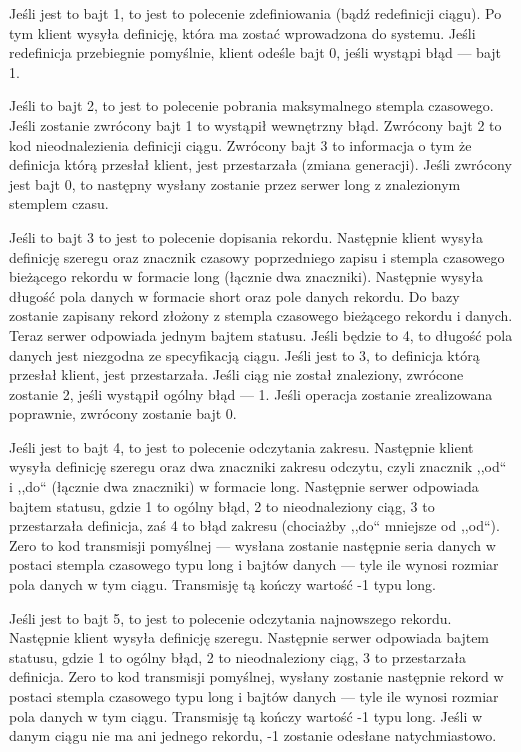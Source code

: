 \documentclass[a4paper,polish,12pt,twoside]{article}
\begin{document}
Jeśli jest to bajt 1, to jest to polecenie zdefiniowania (bądź redefinicji ciągu). Po tym klient wysyła definicję, która ma zostać wprowadzona do systemu. Jeśli redefinicja przebiegnie pomyślnie, klient odeśle bajt 0, jeśli wystąpi błąd --- bajt 1.

Jeśli to bajt 2, to jest to polecenie pobrania maksymalnego stempla czasowego. Jeśli zostanie zwrócony bajt 1 to wystąpił wewnętrzny błąd. Zwrócony bajt 2 to kod nieodnalezienia definicji ciągu. Zwrócony bajt 3 to informacja o tym że definicja którą przesłał klient, jest przestarzała (zmiana generacji). Jeśli zwrócony jest bajt 0, to następny wysłany zostanie przez serwer long z znalezionym stemplem czasu.

Jeśli to bajt 3 to jest to polecenie dopisania rekordu. Następnie klient wysyła definicję szeregu oraz znacznik czasowy poprzedniego zapisu i stempla czasowego bieżącego rekordu w formacie long (łącznie dwa znaczniki). Następnie wysyła długość pola danych w formacie short oraz pole danych rekordu. Do bazy zostanie zapisany rekord złożony z stempla czasowego bieżącego rekordu i danych.
Teraz serwer odpowiada jednym bajtem statusu. Jeśli będzie to 4, to długość pola danych jest niezgodna ze specyfikacją ciągu. Jeśli jest to 3, to definicja którą przesłał klient, jest przestarzała. Jeśli ciąg nie został znaleziony, zwrócone zostanie 2, jeśli wystąpił ogólny błąd --- 1. Jeśli operacja zostanie zrealizowana poprawnie, zwrócony zostanie bajt 0.

Jeśli jest to bajt 4, to jest to polecenie odczytania zakresu. Następnie klient wysyła definicję szeregu oraz dwa znaczniki zakresu odczytu, czyli znacznik ,,od`` i ,,do`` (łącznie dwa znaczniki) w formacie long. Następnie serwer odpowiada bajtem statusu, gdzie 1 to ogólny błąd, 2 to nieodnaleziony ciąg, 3 to przestarzała definicja, zaś 4 to błąd zakresu (chociażby ,,do`` mniejsze od ,,od``). Zero to kod transmisji pomyślnej --- wysłana zostanie następnie seria danych w postaci stempla czasowego typu long i bajtów danych --- tyle ile wynosi rozmiar pola danych w tym ciągu. Transmisję tą kończy wartość -1 typu long.

Jeśli jest to bajt 5, to jest to polecenie odczytania najnowszego rekordu. Następnie klient wysyła definicję szeregu. Następnie serwer odpowiada bajtem statusu, gdzie 1 to ogólny błąd, 2 to nieodnaleziony ciąg, 3 to przestarzała definicja. Zero to kod transmisji pomyślnej, wysłany zostanie następnie rekord w postaci stempla czasowego typu long i bajtów danych --- tyle ile wynosi rozmiar pola danych w tym ciągu. Transmisję tą kończy wartość -1 typu long. Jeśli w danym ciągu nie ma ani jednego rekordu, -1 zostanie odesłane natychmiastowo.
\end{document}
